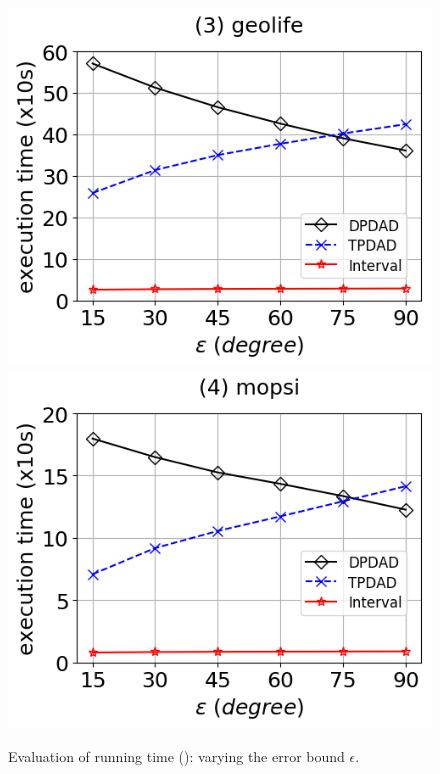 \begin{figure}[tb!]
	\includegraphics[scale=0.315]{Figures/Exp-DAD-time-epsilon-geolife.png}	\hspace{1ex}
	\includegraphics[scale=0.315]{Figures/Exp-DAD-time-epsilon-mopsi.png}		
	\vspace{-3ex}
	\caption{\small Evaluation of running time (\dad): varying the error bound $\epsilon$.}\label{fig:time-epsilon-dad}
	\vspace{-2ex}
\end{figure}


